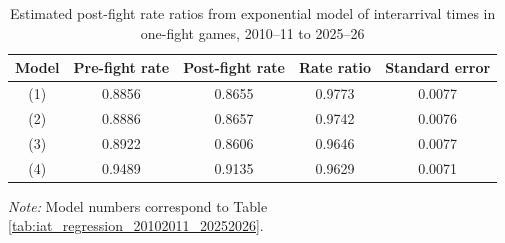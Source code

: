 \begin{table}[!h]
\centering
\caption{Estimated post-fight rate ratios from exponential model of interarrival times in one-fight games, 2010--11 to 2025--26}
\label{tab:post_fight_rate_ratios_20102011_20252026}

\begin{tabular}{ccccc}
\toprule
Model & Pre-fight rate & Post-fight rate & Rate ratio & Standard error \\
\midrule
(1) & 0.8856 & 0.8655 & 0.9773 & 0.0077 \\
(2) & 0.8886 & 0.8657 & 0.9742 & 0.0076 \\
(3) & 0.8922 & 0.8606 & 0.9646 & 0.0077 \\
(4) & 0.9489 & 0.9135 & 0.9629 & 0.0071 \\
\bottomrule
\end{tabular}

\vspace{0.4em}
\parbox{0.95\textwidth}{
\footnotesize
\textit{Note:} Model numbers correspond to Table \ref{tab:iat_regression_20102011_20252026}.
}
\end{table}

